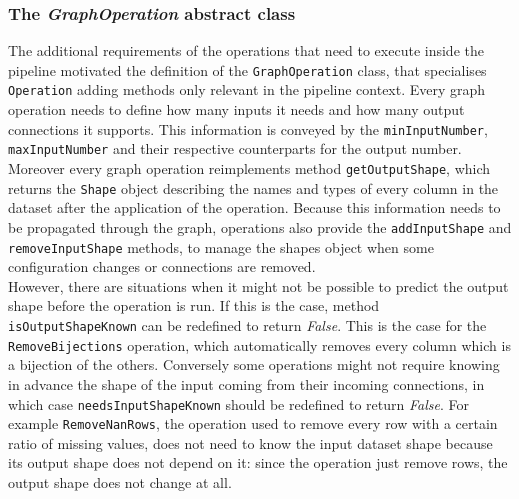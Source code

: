 \subsubsection{The \textit{GraphOperation} abstract class}
The additional requirements of the operations that need to execute inside the pipeline motivated the definition of the \texttt{GraphOperation} class, that specialises \texttt{Operation} adding methods only relevant in the pipeline context. Every graph operation needs to define how many inputs it needs and how many output connections it supports. This information is conveyed by the \texttt{minInputNumber}, \texttt{maxInputNumber} and their respective counterparts for the output number. \\
Moreover every graph operation reimplements method \texttt{getOutputShape}, which returns the \texttt{Shape} object describing the names and types of every column in the dataset after the application of the operation. Because this information needs to be propagated through the graph, operations also provide the \texttt{addInputShape} and \texttt{removeInputShape} methods, to manage the shapes object when some configuration changes or connections are removed.\\
However, there are situations when it might not be possible to predict the output shape before the operation is run. If this is the case, method \texttt{isOutputShapeKnown} can be redefined to return \textit{False}. This is the case for the \texttt{RemoveBijections} operation, which automatically removes every column which is a bijection of the others. Conversely some operations might not require knowing in advance the shape of the input coming from their incoming connections, in which case \texttt{needsInputShapeKnown} should be redefined to return \textit{False}. For example \texttt{RemoveNanRows}, the operation used to remove every row with a certain ratio of missing values, does not need to know the input dataset shape because its output shape does not depend on it: since the operation just remove rows, the output shape does not change at all.

